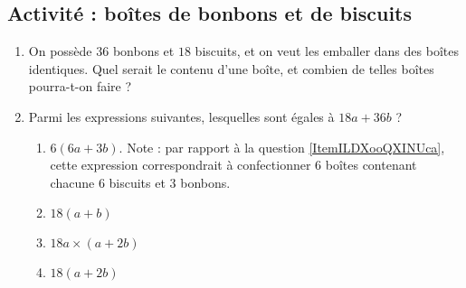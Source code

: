 
\subsection*{Activité : boîtes de bonbons et de biscuits}

\begin{enumerate}
    \item   \label{ItemILDXooQXINUca}
        
On possède \( 36\) bonbons et \( 18\) biscuits, et on veut les emballer dans des boîtes identiques. Quel serait le contenu d'une boîte, et combien de telles boîtes pourra-t-on faire ?

\item
    Parmi les expressions suivantes, lesquelles sont égales à \( 18a+36b\) ?
    \begin{enumerate}
        \item
            \( 6(6a+3b)\). Note : par rapport à la question \ref{ItemILDXooQXINUca}, cette expression correspondrait à confectionner \( 6\) boîtes contenant chacune \( 6\) biscuits et \( 3\) bonbons.
        \item
            \( 18(a+b)\)
        \item
            \( 18a\times (a+2b)\)
        \item
            \( 18(a+2b)\)
    \end{enumerate}
\end{enumerate}
